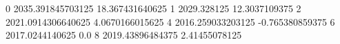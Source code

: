 0 2035.391845703125 18.367431640625
1 2029.328125 12.3037109375
2 2021.0914306640625 4.0670166015625
4 2016.259033203125 -0.765380859375
6 2017.0244140625 0.0
8 2019.43896484375 2.41455078125
